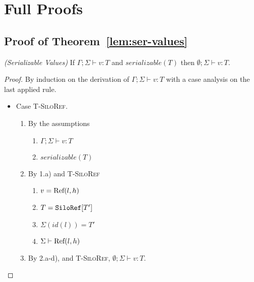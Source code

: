 \section{Full Proofs}

\subsection{Proof of Theorem~\ref{lem:ser-values}}\label{app:ser-values}

\begin{thmun}
\emph{(Serializable Values)}
If $\Gamma ; \Sigma \vdash v : T$ and $serializable(T)$ then $\emptyset ; \Sigma \vdash v : T$.
\end{thmun}
\begin{proof}
By induction on the derivation of $\Gamma ; \Sigma \vdash v : T$ with a case analysis on the last applied rule.

\begin{itemize}
\item Case \textsc{T-SiloRef}.
\begin{enumerate}
\item By the assumptions
  \begin{enumerate}[label=(\alph*)]
  \item $\Gamma ; \Sigma \vdash v : T$
  \item $serializable(T)$
  \end{enumerate}
\item By 1.a) and \textsc{T-SiloRef}
  \begin{enumerate}[label=(\alph*)]
  \item $v = {\textrm{Ref}(l, h)}$
  \item $T = \texttt{SiloRef}[T']$
  \item $\Sigma(id(l)) = T'$
  \item $\Sigma \vdash {\textrm{Ref}(l, h)}$
  \end{enumerate}
\item By 2.a-d), and \textsc{T-SiloRef}, $\emptyset ; \Sigma \vdash v : T$.
\end{enumerate}


\end{itemize}
\end{proof}
